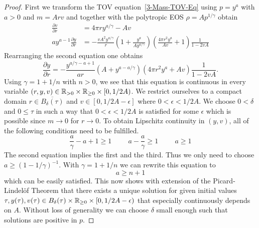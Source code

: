 \begin{proof}
	First we transform the TOV equation~\ref{3-Mass-TOV-Eq} using $p=y^a$ with $a>0$ and $m=Arv$ and together with the polytropic EOS $\rho=Ap^{1/\gamma}$ obtain
	\begin{align}
		\frac{\partial v}{\partial r} &= 4\pi ry^{a/\gamma}-Av\\
		ay^{a-1}\frac{\partial y}{\partial r} &= -\frac{vA^2 y^{a/\gamma}}{r}\left(1+\frac{y^a}{Ay^{a/\gamma}}\right)\left(\frac{4\pi r^2 y^a}{Av} +1\right)\frac{1}{1-2vA}
		\label{tmp-label-2}
	\end{align}
	Rearranging the second equation one obtains
	\begin{equation}
		\frac{\partial y}{\partial r} = -\frac{y^{a/\gamma-a+1}}{ar}\left(A+y^{a-a/\gamma}\right)\left(4\pi r^2 y^a +Av\right)\frac{1}{1-2vA}.
		\label{eq:99-App-TOV-No-Mass-Transformed-TOV-Eq}
	\end{equation}
	Using $\gamma=1+1/n$ with $n>0$, we see that this equation is continuous in every variable $(r,y,v)\in\mathbb{R}_{>0}\times\mathbb{R}_{\geq0}\times[0,1/2A)$.
	We restrict ourselves to a compact domain $r\in \overline{B_{\delta}(\tau)}$ and $v\in[0,1/2A-\epsilon]$ where $0<\epsilon<1/2A$.
	We choose $0<\delta$ and $0\leq\tau$ in such a way that $0<\epsilon<1/2A$ is satisfied for some $\epsilon$ which is possible since $m\rightarrow0$ for $r\rightarrow0$.
	To obtain Lipschitz continuity in $(y,v)$, all of the following conditions need to be fulfilled.
	\begin{equation}
		\frac{a}{\gamma}-a+1 \geq 1 \hspace{1cm} a-\frac{a}{\gamma} \geq 1 \hspace{1cm} a \geq 1
		\label{eq:99-App-TOV-No-Mass-Parameter-Condition}
	\end{equation}
	The second equation implies the first and the third.
	Thus we only need to choose $a\geq(1-1/\gamma)^{-1}$.
	With $\gamma=1+1/n$ we can rewrite this equation to
	\begin{equation}
		a\geq n+1
		\label{eq:99-App-TOV-No-Mass-Ineq-1}
	\end{equation}
	which can be easily satisfied.
	This now shows with extension of the Picard-Lindelöf Theorem that there exists a unique solution for given initial values $\tau, y(\tau), v(\tau)\in B_{\delta}(\tau)\times\mathbb{R}_{\geq0}\times[0,1/2A-\epsilon)$ that especially continuously depends on $A$.
	Without loss of generality we can choose $\delta$ small enough such that solutions are positive in $p$.

\end{proof}
